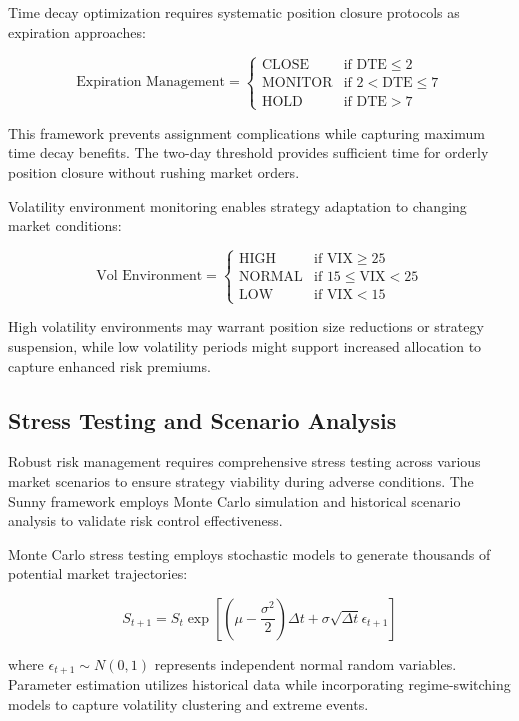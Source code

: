 \documentclass[
  american,
  11pt,
  11pt,
  letterpaper,
  onecolumn]{article}
\begin{document}
Time decay optimization requires systematic position closure protocols
as expiration approaches:

\[\text{Expiration Management} = \begin{cases}
\text{CLOSE} & \text{if } \text{DTE} \leq 2 \\
\text{MONITOR} & \text{if } 2 < \text{DTE} \leq 7 \\
\text{HOLD} & \text{if } \text{DTE} > 7
\end{cases}\]

This framework prevents assignment complications while capturing maximum
time decay benefits. The two-day threshold provides sufficient time for
orderly position closure without rushing market orders.

Volatility environment monitoring enables strategy adaptation to
changing market conditions:

\[\text{Vol Environment} = \begin{cases}
\text{HIGH} & \text{if } \text{VIX} \geq 25 \\
\text{NORMAL} & \text{if } 15 \leq \text{VIX} < 25 \\
\text{LOW} & \text{if } \text{VIX} < 15
\end{cases}\]

High volatility environments may warrant position size reductions or
strategy suspension, while low volatility periods might support
increased allocation to capture enhanced risk premiums.

\subsection{Stress Testing and Scenario
Analysis}\label{stress-testing-and-scenario-analysis}

Robust risk management requires comprehensive stress testing across
various market scenarios to ensure strategy viability during adverse
conditions. The Sunny framework employs Monte Carlo simulation and
historical scenario analysis to validate risk control effectiveness.

Monte Carlo stress testing employs stochastic models to generate
thousands of potential market trajectories:

\[S_{t+1} = S_t \exp\left[\left(\mu - \frac{\sigma^2}{2}\right)\Delta t + \sigma\sqrt{\Delta t}\epsilon_{t+1}\right]\]

where \(\epsilon_{t+1} \sim N(0,1)\) represents independent normal
random variables. Parameter estimation utilizes historical data while
incorporating regime-switching models to capture volatility clustering
and extreme events.
\end{document}
